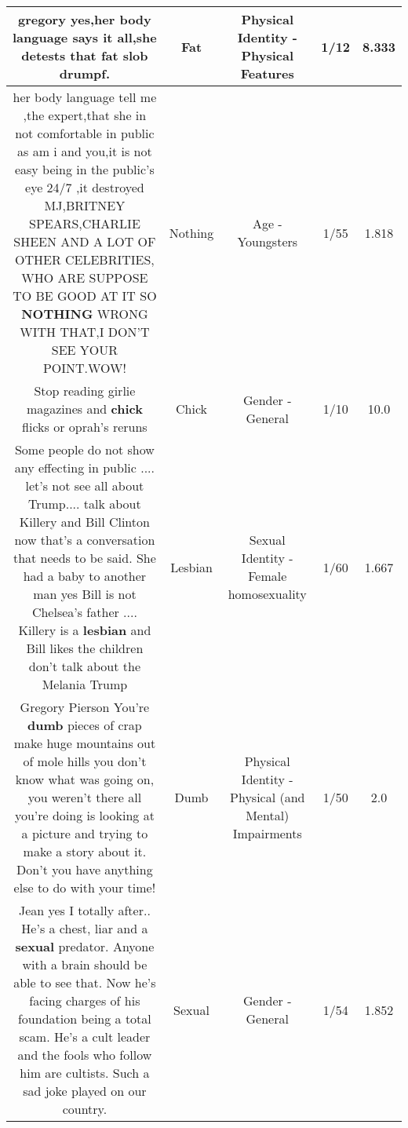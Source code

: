\documentclass[11pt]{article}
\newlength\mylength
\begin{document}
\begin{center}
\begin{longtable}{|C{.65\mylength}|C{.30\mylength}|C{.12\mylength}|C{.12\mylength}|C{.12\mylength}|}
  \small gregory yes,her body language says it all,she detests that \textbf{fat} slob drumpf.\normalsize   & Fat & Physical Identity - Physical Features & 1/12 & 8.333 \\  \hline
  \small her body language tell me ,the expert,that she in not comfortable in public as am i and you,it is not easy being in the public's eye 24/7 ,it destroyed MJ,BRITNEY SPEARS,CHARLIE SHEEN AND A LOT OF OTHER CELEBRITIES, WHO ARE SUPPOSE TO BE GOOD AT IT SO \textbf{NOTHING} WRONG WITH THAT,I DON'T SEE YOUR POINT.WOW!\normalsize   & Nothing & Age - Youngsters & 1/55 & 1.818 \\  \hline
  \small Stop reading girlie magazines and \textbf{chick} flicks or oprah's reruns\normalsize   & Chick & Gender - General & 1/10 & 10.0 \\  \hline
  \small Some people do not show any effecting  in public .... let's not see all about Trump.... talk about Killery and Bill Clinton now that's a conversation that needs to be said.  She had a baby to another man yes Bill is not Chelsea's father .... Killery is a \textbf{lesbian} and Bill likes the children don't talk about the Melania Trump\normalsize   & Lesbian & Sexual Identity - Female homosexuality & 1/60 & 1.667 \\  \hline
  \small Gregory Pierson You're \textbf{dumb} pieces of crap make huge mountains out of mole hills you don't know what was going on, you weren't there all you're doing is looking at a picture  and trying to make a story about it. Don't you have anything else to do with your time!\normalsize   & Dumb & Physical Identity - Physical (and Mental) Impairments & 1/50 & 2.0 \\  \hline
  \small Jean yes I totally after.. He's a chest, liar and a \textbf{sexual} predator. Anyone with a brain should be able to see that. Now he's facing charges of his foundation being a total scam. He's a cult leader and the fools who follow him are cultists. Such a sad joke played on our country.\normalsize   & Sexual & Gender - General & 1/54 & 1.852 \\  \hline

\end{longtable}
\end{center}
\end{document}
